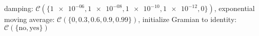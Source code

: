 damping: $\mathcal{C}(\{\num[scientific-notation=true]{1e-06},\num[scientific-notation=true]{1e-08},\num[scientific-notation=true]{1e-10},\num[scientific-notation=true]{1e-12},\num[scientific-notation=false]{0}\})$, exponential moving average: $\mathcal{C}(\{\num[scientific-notation=false]{0},\num[scientific-notation=true]{0.3},\num[scientific-notation=true]{0.6},\num[scientific-notation=true]{0.9},\num[scientific-notation=true]{0.99}\})$, initialize Gramian to identity: $\mathcal{C}(\{\text{no},\text{yes}\})$
